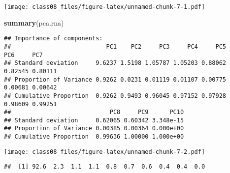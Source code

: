 \documentclass[
]{article}
\newenvironment{Shaded}{\begin{snugshade}}{\end{snugshade}}
\newcommand{\CommentTok}[1]{\textcolor[rgb]{0.56,0.35,0.01}{\textit{#1}}}
\newcommand{\DataTypeTok}[1]{\textcolor[rgb]{0.13,0.29,0.53}{#1}}
\newcommand{\DecValTok}[1]{\textcolor[rgb]{0.00,0.00,0.81}{#1}}
\newcommand{\KeywordTok}[1]{\textcolor[rgb]{0.13,0.29,0.53}{\textbf{#1}}}
\newcommand{\NormalTok}[1]{#1}
\newcommand{\OperatorTok}[1]{\textcolor[rgb]{0.81,0.36,0.00}{\textbf{#1}}}
\newcommand{\StringTok}[1]{\textcolor[rgb]{0.31,0.60,0.02}{#1}}
\begin{document}
\texttt{[image: class08\_files/figure-latex/unnamed-chunk-7-1.pdf]}

\begin{Shaded}
\begin{Highlighting}[]
\KeywordTok{summary}\NormalTok{(pca.rna)}
\end{Highlighting}
\end{Shaded}

\begin{verbatim}
## Importance of components:
##                           PC1    PC2     PC3     PC4     PC5     PC6     PC7
## Standard deviation     9.6237 1.5198 1.05787 1.05203 0.88062 0.82545 0.80111
## Proportion of Variance 0.9262 0.0231 0.01119 0.01107 0.00775 0.00681 0.00642
## Cumulative Proportion  0.9262 0.9493 0.96045 0.97152 0.97928 0.98609 0.99251
##                            PC8     PC9      PC10
## Standard deviation     0.62065 0.60342 3.348e-15
## Proportion of Variance 0.00385 0.00364 0.000e+00
## Cumulative Proportion  0.99636 1.00000 1.000e+00
\end{verbatim}

\begin{Shaded}
\end{Shaded}

\texttt{[image: class08\_files/figure-latex/unnamed-chunk-7-2.pdf]}

\begin{Shaded}
\end{Shaded}

\begin{verbatim}
##  [1] 92.6  2.3  1.1  1.1  0.8  0.7  0.6  0.4  0.4  0.0
\end{verbatim}
\end{document}
